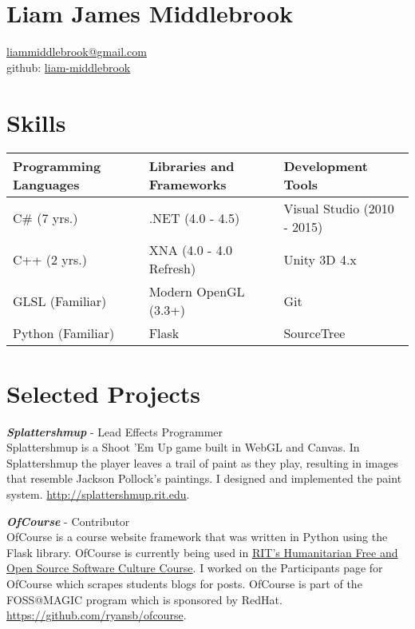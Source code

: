 \documentclass[line,margin]{res}
\begin{document}
\marginsize{.5in}{.5in}{.5in}{.5in}

\section{Liam James Middlebrook}

\href{mailto:liammiddlebrook@gmail.com}{liammiddlebrook@gmail.com}\\
github: \href{https://github.com/liam-middlebrook}{liam-middlebrook}

\begin{resume}


\section{Skills}
\begin{table}[h]
\begin{tabular}{@{}lll@{}}
\toprule
Programming Languages & Libraries and Frameworks & Development Tools           \\ \midrule
C\# (7 yrs.)          & .NET (4.0 - 4.5)         & Visual Studio (2010 - 2015) \\
C++ (2 yrs.)          & XNA (4.0 - 4.0 Refresh)  & Unity 3D 4.x                \\
GLSL (Familiar)       & Modern OpenGL (3.3+)     & Git                         \\
Python (Familiar)     & Flask                    & SourceTree                  \\ \bottomrule
\end{tabular}
\end{table}


\section{Selected Projects}

{\textbf{\emph{Splattershmup}}} - Lead Effects Programmer\\
Splattershmup is a Shoot 'Em Up game built in WebGL and Canvas. In Splattershmup the player leaves
a trail of paint as they play, resulting in images that resemble Jackson Pollock's paintings.
I designed and implemented the paint system.
\url{http://splattershmup.rit.edu}.

{\textbf{\emph{OfCourse}}} - Contributor\\
OfCourse is a course website framework that was written in Python using the Flask library.
OfCourse is currently being used in \href{http://hfoss-fossrit.rhcloud.com}{RIT's Humanitarian
Free and Open Source Software Culture Course}. I worked on the Participants page for OfCourse
which scrapes students blogs for posts. OfCourse is part of the FOSS@MAGIC
program which is sponsored by RedHat.\\
\url{https://github.com/ryansb/ofcourse}.


\end{resume}
\end{document}
